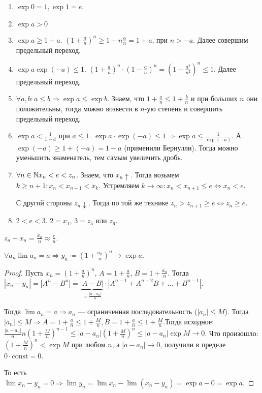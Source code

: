\begin{enumerate}
    \item $\exp 0 = 1, \exp 1 = e$.
    \item  $\exp a > 0$
    \item  $\exp a \ge 1+a$. $\left(1+\frac{a}{n}\right)^n \ge 1 + n \frac{a}{n} = 1+a$, при $n > -a$. Далее совершим предельный переход.
    \item  $\exp a \exp (-a) \le 1$. $\left(1+\frac{a}{n}\right)^n\cdot\left(1-\frac{a}{n}\right)^n = \left(1-\frac{a^2}{n^2}\right)^n \le 1$. Далее предельный переход.
    \item $\forall a, b: a \le b \Rightarrow \exp a \le \exp b$. Знаем, что $1 + \frac{a}{n} \le 1 + \frac{b}{n}$ и при больших $n$ они положительны, тогда можно возвести в  $n$-ую степень и совершить предельный переход. 
    \item  $\exp a < \frac{1}{1-a}$ при $a \le 1$. $\exp a \cdot \exp (-a) \le 1 \Rightarrow \exp a \le \frac{1}{\exp(-a)}$. А $\exp(-a) \ge 1 + (-a) = 1 - a$ (применили Бернулли). Тогда можно уменьшить знаменатель, тем самым увеличить дробь.
    \item $\forall n \in \mathbb{N} x_n < e < z_n$. Знаем, что $x_n \uparrow$. Тогда возьмем  $k \ge n + 1: x_n < x_{n+1} < x_k$. Устремляем $k \to \infty: x_n < x_{n+1} \le e \iff x_n < e$.

        С другой стороны $z_n \downarrow$. Тогда по той же технике $z_n > z_{n+1} \ge e \iff z_n \ge e$.
    \item $2 < e < 3$. $2 = x_1$,  $3 = z_{5}$ или  $z_6$.
\end{enumerate}
\begin{remark}
    $z_n - x_n = \frac{x_n}{n} \approx \frac{e}{n}$.
\end{remark}
\begin{lemma}
    $\forall a_n \lim a_n = a \Rightarrow y_n \coloneqq (1+\frac{a_n}{n})^n \to \exp a$.
\end{lemma}
\begin{proof}
    Пусть $x_n = (1+\frac{a}{n})^n$, $A = 1 + \frac{a}{n}$, $B = 1 + \frac{a_n}{n}$. Тогда $|x_n - y_n| = |A^n - B^n| = \underbrace{|A-B|}_{=\frac{|a-a_n|}{n}}\cdot|A^{n-1} + A^{n-2}B + \ldots + B^{n-1}|$.

    Тогда $\lim a_n = a \Rightarrow a_n$ --- ограниченная последовательность ($|a_n| \le M$). Тогда  $|a_n| \le M \Rightarrow A = 1 + \frac{a}{n} \le 1 + \frac{M}{n}, B = 1 + \frac{a}{n} \le 1 + \frac{M}{n}$.Тогда исходное: $\frac{|a-a_n|}{n} n \left(1+\frac{M}{n}\right)^{n-1} \le |a-a_n|(1+\frac{M}{n})^n \le |a-a_n|\exp M \to 0$. Что произошло: $(1+\frac{M}{n})^n < \exp M$ при любом $n$, а  $|a-a_n| \to 0$, получили  в пределе $0 \cdot \text{const} = 0$. 

    То есть $\lim x_n - y_n = 0 \Rightarrow \lim y_n = \lim x_n - \lim (x_n - y_n) = \exp a - 0 = \exp a$.
\end{proof}
